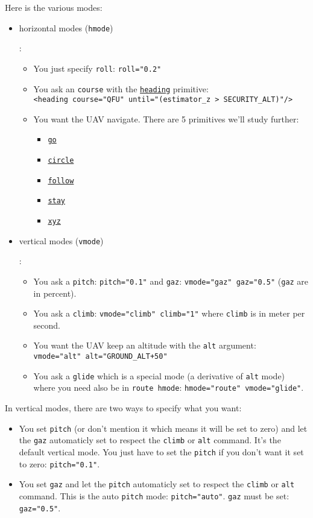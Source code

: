 \documentclass{article}
\renewcommand{\tt}[1]{\texttt{#1}}
\newcommand{\ex}[1]{\colorbox[gray]{0.92}{\tt{#1}}}
\newcommand{\qt}[1]{\textcolor{gris75}{#1}}
\begin{document}
Here is the various modes:
\begin{itemize}
	\item \hypertarget{horizontalmodes}{horizontal modes (\tt{hmode})}:
	\begin{itemize}
		\item You just specify \tt{roll}:
		\ex{roll="\qt{0.2}"}
		\item You ask an \tt{course} with the
		\hyperlink{heading}{\tt{heading}} primitive:\\
		\ex{<heading course="\qt{QFU}" until="\qt{(estimator\_z > SECURITY\_ALT)}"/>}
		\item You want the UAV navigate. There are 5 primitives we'll study further:
		\begin{itemize}
			\item \tt{\hyperlink{go}{go}}
			\item \tt{\hyperlink{circle}{circle}}
			\item \tt{\hyperlink{follow}{follow}}
			\item \tt{\hyperlink{stay}{stay}}
			\item \tt{\hyperlink{xyz}{xyz}}
		\end{itemize}
	\end{itemize}
	\item \hypertarget{verticalmodes}{vertical modes (\tt{vmode})}:
	\begin{itemize}
		\item You ask a \tt{pitch}: \ex{pitch="\qt{0.1}"}
		and \tt{gaz}: \ex{vmode="\qt{gaz}" gaz="\qt{0.5}"}
		(\tt{gaz} are in percent).
		\item You ask a \tt{climb}: \ex{vmode="\qt{climb}" climb="\qt{1}"}
		where \tt{climb} is in meter per second.
		
		\item You want the UAV keep an altitude with the \tt{alt} argument:\\
		\ex{vmode="\qt{alt}" alt="\qt{GROUND\_ALT+50}"}
		\item You ask a \tt{glide} which is a special mode (a derivative of
		\tt{alt} mode) where you need also be in \tt{route hmode}:
		\ex{hmode="\qt{route}" vmode="\qt{glide}"}.
	\end{itemize}
\end{itemize}

In vertical modes, there are two ways to specify what you want:
\begin{itemize}
	\item You set \tt{pitch} (or don't mention it which means it will be
	set to zero) and let the \tt{gaz} automaticly set to respect the
	\tt{climb} or \tt{alt} command. It's the default vertical mode.
	You just have to set the \tt{pitch} if you don't want it set to
	zero: \ex{\tt{pitch="\qt{0.1}"}}.
	
	\item You set \tt{gaz} and let the \tt{pitch} automaticly set to
	respect the \tt{climb} or \tt{alt} command. This is the auto
	\tt{pitch} mode: \ex{\tt{pitch="\qt{auto}"}}.
	\tt{gaz} must be set:	\ex{\tt{gaz="\qt{0.5}"}}.
\end{itemize}
\end{document}
